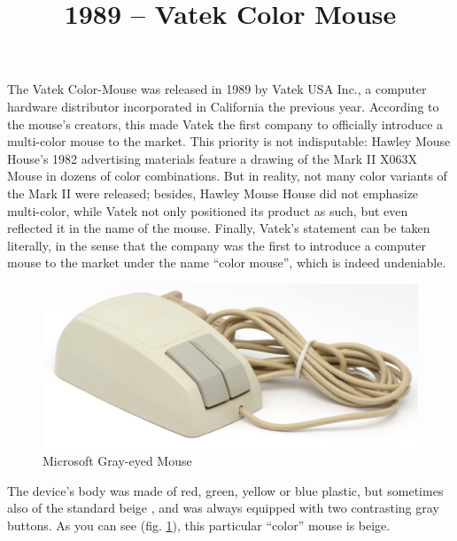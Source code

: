 \documentclass[11pt, a4paper]{article}
\begin{document}
\title{1989 -- Vatek Color Mouse}
\date{}
\maketitle
{}

The Vatek Color-Mouse was released in 1989 by Vatek USA Inc., a computer hardware distributor incorporated in California the previous year. According to the mouse's creators, this made Vatek the first company to officially introduce a multi-color mouse to the market. This priority is not indisputable: Hawley Mouse House's 1982 advertising materials feature a drawing of the Mark II X063X Mouse in dozens of color combinations. But in reality, not many color variants of the Mark II were released; besides, Hawley Mouse House did not emphasize multi-color, while Vatek not only positioned its product as such, but even reflected it in the name of the mouse. Finally, Vatek's statement can be taken literally, in the sense that the company was the first to introduce a computer mouse to the market under the name ``color mouse'', which is indeed undeniable.

\begin{figure}[h]
   \centering
    \includegraphics[scale=0.45]{1989_vatek_color_mouse/pic_30.jpg}
    \caption{Microsoft Gray-eyed Mouse}
    \label{fig:VatekColorPic}
\end{figure}

The device's body was made of red, green, yellow or blue plastic, but sometimes also of the standard beige \cite{mouses}, and was always equipped with two contrasting gray buttons. As you can see (fig. \ref{fig:VatekColorPic}), this particular ``color'' mouse is beige.
\end{document}

